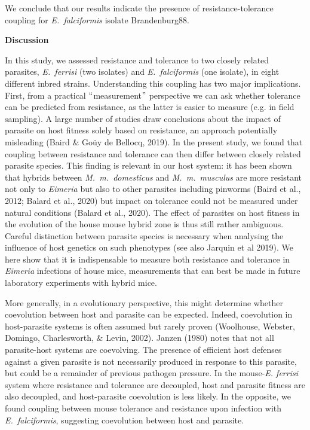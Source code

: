 \documentclass[12pt]{article}
\renewcommand{\_}{\kern-1.5pt\textunderscore\kern-1.5pt}
\begin{document}
\textcolor[HTML]{FF0000}{We conclude that our results indicate the presence of resistance-tolerance coupling for \textit{E. falciformis} isolate Brandenburg88.}\par

\begin{FlushLeft}
{\fontsize{14pt}{16.8pt}\selectfont \textbf{Discussion}\par}
\end{FlushLeft}\par

In this study, we assessed resistance and tolerance to two closely related parasites, \textit{E. ferrisi} (two isolates) and \textit{E. falciformis} (one isolate), in \textcolor[HTML]{FF0000}{eight} different inbred strains. Understanding this coupling has two major implications. \textcolor[HTML]{CE181E}{First, f}rom a practical $``$measurement$"$  perspective we can ask whether tolerance can be predicted from resistance, as the latter is easier to measure (e.g. in field sampling). A large number of studies draw conclusions about the impact of parasite on host fitness solely based on resistance, an approach potentially misleading (Baird $\&$  Goüy de Bellocq, 2019). \textcolor[HTML]{CE181E}{In the present study, we found that coupling between resistance and tolerance can then differ between closely related parasite species. This finding is relevant in our host system: it has been shown that hybrids between \textit{M. m. domesticus} and \textit{M. m. musculus} are more resistant not only to \textit{Eimeria} but also to other parasites including pinworms (Baird et al., 2012; Balard et al., 2020) but impact on tolerance could not be measured under natural conditions (Balard et al., 2020). The effect of parasites on host fitness in the evolution of the house mouse hybrid zone is thus still rather ambiguous. Careful distinction between parasite species is necessary when analysing the influence of host genetics on such phenotypes (see also Jarquin et al 2019). We here show that it is indispensable to measure both resistance and tolerance in \textit{Eimeria} infections of house mice, measurements that can best be made in future laboratory experiments with hybrid mice. }\par

More generally, in a evolutionary perspective, this might determine whether coevolution between host and parasite can be expected. \textcolor[HTML]{FF0000}{Indeed, coevolution in host-parasite systems is often assumed but rarely proven (}Woolhouse, Webster, Domingo, Charlesworth, $\&$  Levin, 2002). Janzen (1980) notes that not all parasite-host systems are coevolving. The presence of efficient host defenses against a given parasite is not necessarily produced in response to this parasite, but could be \textcolor[HTML]{FF0000}{a remainder of previous pathogen pressure. In the mouse-\textit{E. ferrisi} system where resistance and tolerance are decoupled, host and parasite fitness are also decoupled, and host-parasite coevolution is less likely. In the opposite, we found coupling between mouse tolerance and resistance upon infection with \textit{E. falciformis}, suggesting coevolution between host and parasite. }\par
\end{document}
